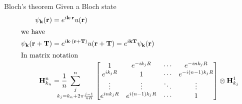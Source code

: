 \begin{frame}
\begin{block}{Bloch's theorem}
    Given a Bloch state
    \begin{align*}
      \psi_\kk(\rr) &= e^{i\kk\cdot\rr} u(\rr)
      \\
      \shortintertext{we have}
      \psi_\kk(\rr+\mathbf T) &= e^{i\kk\cdot(\rr+\mathbf T)} u(\rr+\mathbf T) =
      e^{i\kk\mathbf T}\psi_\kk(\rr)
      \\
      \shortintertext{In matrix notation}
      \HH_{k_n}^n &=\frac1n
      \;
      \sum_{
          \mathclap{
              \substack{j\\
                  k_j=k_n+2\pi\frac{j-1}{nR}
              }
          }
      }^n
      \qquad
      \begin{bmatrix}
        1
        &
        e^{-i k_jR}
        &
        \cdots
        &
        e^{-i nk_jR}
        \\
        e^{i k_jR}
        &
        1
        &
        \cdots
        &
        e^{-i (n-1)k_jR}
        \\
        \vdots
        &
        \vdots
        &
        \ddots
        &
        \vdots
        \\
        e^{i nk_jR}
        &
        e^{i (n-1)k_jR}
        &
        \cdots
        &1
      \end{bmatrix}
      \otimes
      \HH_{k_j}^1
    \end{align*}

  \end{block}

\end{frame}

